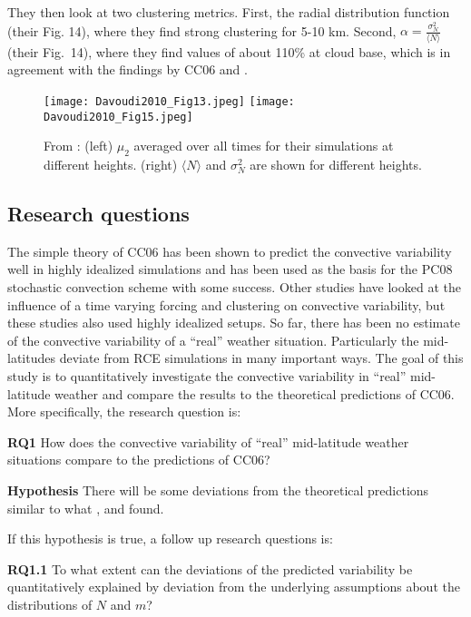 \documentclass[a4paper, 12pt]{article}
\begin{document}
They then look at two clustering metrics. First, the radial distribution function (their Fig. 14), where they find strong clustering for 5-10 km. Second, $\alpha = \frac{\sigma_N^2}{\langle N \rangle}$ (their Fig.~14), where they find values of about 110\% at cloud base, which is in agreement with the findings by CC06 and \cite{Davies2008}. 

\begin{figure}[ht]
\noindent \centering
\texttt{[image: Davoudi2010\_Fig13.jpeg]}
\texttt{[image: Davoudi2010\_Fig15.jpeg]}\\
\caption{From \cite{Davoudi2010}: (left) $\mu_2$ averaged over all times for their simulations at different heights. (right) $\langle N \rangle$ and $\sigma_N^2$ are shown for different heights.} \label{fig:Davoudi2010}
\end{figure}

\subsection{Research questions}
The simple theory of CC06 has been shown to predict the convective variability well in highly idealized simulations and has been used as the basis for the PC08 stochastic convection scheme with some success. Other studies have looked at the influence of a time varying forcing and clustering on convective variability, but these studies also used highly idealized setups. So far, there has been no estimate of the convective variability of a ``real'' weather situation. Particularly the mid-latitudes deviate from RCE simulations in many important ways. The goal of this study is to quantitatively investigate the convective variability in ``real'' mid-latitude weather and compare the results to the theoretical predictions of CC06. More specifically, the research question is:

\textbf{RQ1} How does the convective variability of ``real'' mid-latitude weather situations compare to the predictions of CC06?

\textbf{Hypothesis} There will be some deviations from the theoretical predictions similar to what \cite{Cohen2006}, \cite{Davies2008} and \cite{Davoudi2010} found.

If this hypothesis is true, a follow up research questions is:

\textbf{RQ1.1} To what extent can the deviations of the predicted variability be quantitatively explained by deviation from the underlying assumptions about the distributions of $N$ and $m$?
\end{document}
